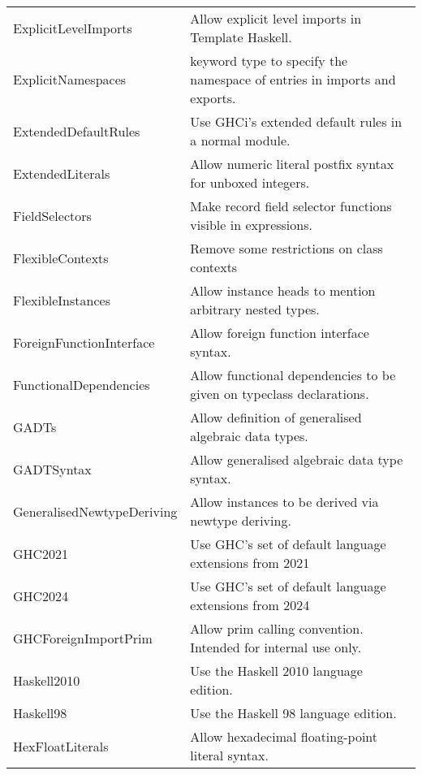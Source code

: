 \documentclass[openany, 12pt]{book}
\begin{document}
\begin{longtable}{ll}
	ExplicitLevelImports       & Allow explicit level imports in Template Haskell.                          \\
	ExplicitNamespaces         & keyword type to specify the namespace of entries in imports and exports.   \\
	ExtendedDefaultRules       & Use GHCi's extended default rules in a normal module.                      \\
	ExtendedLiterals           & Allow numeric literal postfix syntax for unboxed integers.                 \\
	FieldSelectors             & Make record field selector functions visible in expressions.               \\
	FlexibleContexts           & Remove some restrictions on class contexts                                 \\
	FlexibleInstances          & Allow instance heads to mention arbitrary nested types.                    \\
	ForeignFunctionInterface   & Allow foreign function interface syntax.                                   \\
	FunctionalDependencies     & Allow functional dependencies to be given on typeclass declarations.       \\
	GADTs                      & Allow definition of generalised algebraic data types.                      \\
	GADTSyntax                 & Allow generalised algebraic data type syntax.                              \\
	GeneralisedNewtypeDeriving & Allow instances to be derived via newtype deriving.                        \\
	GHC2021                    & Use GHC’s set of default language extensions from 2021                     \\
	GHC2024                    & Use GHC’s set of default language extensions from 2024                     \\
	GHCForeignImportPrim       & Allow prim calling convention. Intended for internal use only.             \\
	Haskell2010                & Use the Haskell 2010 language edition.                                     \\
	Haskell98                  & Use the Haskell 98 language edition.                                       \\
	HexFloatLiterals           & Allow hexadecimal floating-point literal syntax.                           \\

\end{longtable}
\end{document}
